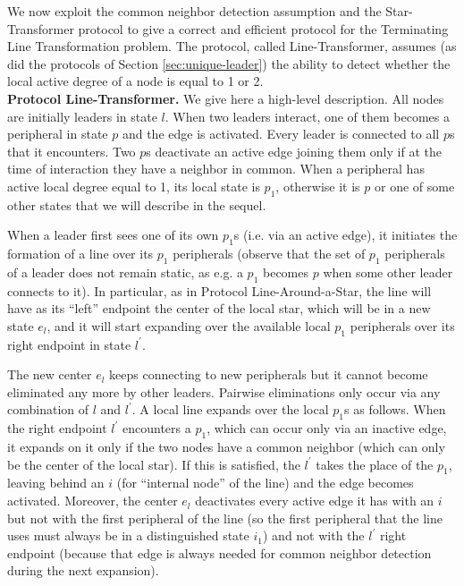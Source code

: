 \documentclass[preprint]{elsarticle}
\begin{document}
We now exploit the common neighbor detection assumption and the Star-Transformer protocol to give a correct and efficient protocol for the Terminating Line Transformation problem. The protocol, called Line-Transformer, assumes (as did the protocols of Section \ref{sec:unique-leader}) the ability to detect whether the local active degree of a node is equal to 1 or 2.\\

\noindent\textbf{Protocol Line-Transformer.} We give here a high-level description. All nodes are initially leaders in state $l$. When two leaders interact, one of them becomes a peripheral in state $p$ and the edge is activated. Every leader is connected to all $p$s that it encounters. Two $p$s deactivate an active edge joining them only if at the time of interaction they have a neighbor in common. When a peripheral has active local degree equal to 1, its local state is $p_1$, otherwise it is $p$ or one of some other states that we will describe in the sequel.

When a leader first sees one of its own $p_1$s (i.e. via an active edge), it initiates the formation of a line over its $p_1$ peripherals (observe that the set of $p_1$ peripherals of a leader does not remain static, as e.g. a $p_1$ becomes $p$ when some other leader connects to it). In particular, as in Protocol Line-Around-a-Star, the line will have as its ``left'' endpoint the center of the local star, which will be in a new state $e_l$, and it will start expanding over the available local $p_1$ peripherals over its right endpoint in state $l^\prime$.

The new center $e_l$ keeps connecting to new peripherals but it cannot become eliminated any more by other leaders. Pairwise eliminations only occur via any combination of $l$ and $l^\prime$. A local line expands over the local $p_1$s as follows. When the right endpoint $l^\prime$ encounters a $p_1$, which can occur only via an inactive edge, it expands on it only if the two nodes have a common neighbor (which can only be the center of the local star). If this is satisfied, the $l^\prime$ takes the place of the $p_1$, leaving
behind an $i$ (for ``internal node'' of the line) and the edge becomes
activated. Moreover, the center $e_l$ deactivates every active edge it has
with an $i$ but not with the first peripheral of the line (so the first
peripheral that the line uses must always be in a distinguished state $i_1$) and not
with the $l^\prime$ right endpoint (because that edge is always needed for common
neighbor detection during the next expansion).
\end{document}
